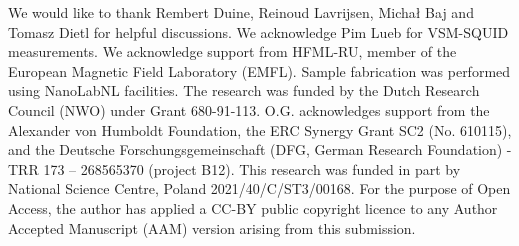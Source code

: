 \documentclass[%
 aps,
prl,
superscriptaddress,
 amsmath,amssymb,
reprint,%
]{revtex4-2}
\begin{document}
We would like to thank Rembert Duine, Reinoud Lavrijsen, Michał Baj and Tomasz Dietl for helpful discussions. We acknowledge Pim Lueb for VSM-SQUID measurements. We acknowledge support from HFML-RU, member of the European Magnetic Field Laboratory (EMFL). Sample fabrication was performed using NanoLabNL facilities. The research was funded by the Dutch Research Council (NWO) under Grant 680-91-113. O.G. acknowledges support from the Alexander von Humboldt Foundation, the ERC Synergy Grant SC2 (No. 610115), and the Deutsche Forschungsgemeinschaft (DFG, German Research Foundation) - TRR 173 – 268565370 (project B12). This research was funded in part by National Science Centre, Poland 2021/40/C/ST3/00168. For the purpose of Open Access, the author has applied a CC-BY public copyright licence to any Author Accepted Manuscript (AAM) version arising from this submission.


\nocite{*}
\end{document}
